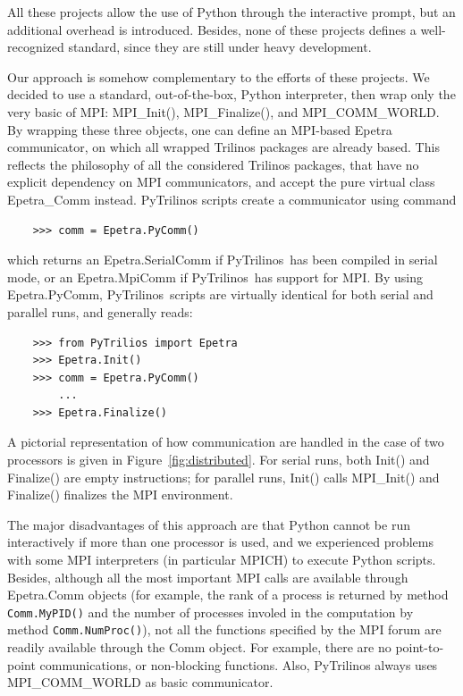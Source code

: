 \documentclass[10pt,relax]{SANDreport}
\newcommand{\PyTrilinos}{{PyTrilinos}}
\begin{document}
All these projects allow the use of Python through the interactive  prompt, 
  but an additional overhead is introduced. Besides, none of these projects
  defines a well-recognized standard, since they are still under heavy
  development. 

Our approach is somehow complementary to the efforts of these projects. 
We decided to use a standard, out-of-the-box, Python interpreter, then wrap 
only the very basic of MPI:
MPI\_Init(), MPI\_Finalize(), and MPI\_COMM\_WORLD. By wrapping these three
objects, one can define an MPI-based Epetra communicator, on which
all wrapped Trilinos packages are already
based. This reflects the philosophy of all the
considered
Trilinos packages, that have no explicit dependency on MPI communicators, and
accept the pure virtual class Epetra\_Comm instead. PyTrilinos scripts create
a communicator using command
\begin{verbatim}
    >>> comm = Epetra.PyComm()
\end{verbatim}
which returns an Epetra.SerialComm if \PyTrilinos\ has been compiled
in serial mode, or an Epetra.MpiComm if \PyTrilinos\ has support for
MPI. By using Epetra.PyComm, \PyTrilinos\ scripts are virtually
identical for both serial and parallel runs, and generally reads:
\begin{verbatim}
    >>> from PyTrilios import Epetra
    >>> Epetra.Init()
    >>> comm = Epetra.PyComm()
        ...
    >>> Epetra.Finalize()
\end{verbatim}
A pictorial representation of how communication are handled in
the case of two  processors is given in Figure~\ref{fig:distributed}. For
serial runs, both Init() and Finalize() are empty instructions; for parallel
runs, Init() calls MPI\_Init() and Finalize() finalizes the MPI environment.

\smallskip

The major disadvantages of this approach are that Python cannot be run
interactively if more than one processor is used, and we experienced problems
with some MPI interpreters (in particular MPICH) to execute Python scripts.
Besides, although all the most important MPI calls are available through
Epetra.Comm objects (for example, the rank of a process is returned by method
                     {\tt Comm.MyPID()} and the number of processes involed in
                     the computation by method {\tt Comm.NumProc()}), not all
the functions specified by the MPI forum are readily available through the
Comm object.  For example, there are no point-to-point communications, or
non-blocking functions. Also, PyTrilinos always uses MPI\_COMM\_WORLD as basic
communicator.
\end{document}
